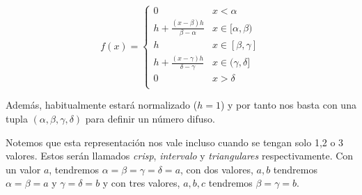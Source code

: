 \begin{equation*}
    f(x) = \left\{ { \begin{array}{cc}
                    0 & x < \alpha \\ 
                    h + \frac{(x-\beta)h}{\beta-\alpha} & x\in [\alpha,\beta) \\
                    h & x\in [\beta,\gamma] \\
                    h + \frac{(x-\gamma)h}{\delta-\gamma} & x\in (\gamma,\delta] \\
                    0 & x > \delta \\ 
                    \end{array}  } \right.
\end{equation*}

Además, habitualmente estará normalizado ($h=1$) y por tanto nos basta con una tupla $(\alpha, \beta, \gamma, \delta)$ para definir un número difuso.

\begin{remark}\label{notaciontrapezoide}
Notemos que esta representación nos vale incluso cuando se tengan solo 1,2 o 3 valores. Estos serán llamados \textit{crisp}, \textit{intervalo} y \textit{triangulares} respectivamente. Con un valor $a$, tendremos $\alpha = \beta = \gamma = \delta = a$, con dos valores, $a,b$ tendremos $\alpha = \beta = a$ y $\gamma = \delta = b$ y con tres valores, $a,b,c$ tendremos $\beta = \gamma = b$.
\end{remark}
